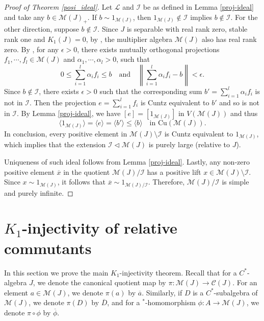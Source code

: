 \documentclass[reqno]{amsart}
\theoremstyle{definition}
\theoremstyle{remark}
\numberwithin{equation}{section}
\theoremstyle{definition}
\newcommand{\calC}{\mathcal{C}}
\newcommand{\calM}{\mathcal{M}}
\newcommand{\calL}{\mathcal{L}}
\newcommand{\calI}{\mathcal{I}}
\begin{document}
\begin{proof}[Proof of Theorem \ref{posi_ideal}] 
Let $\calL$ and $\calI$ be as defined in Lemma \ref{proj-ideal} and take any $b\in\calM(J)_+$.  If $b\sim 1_{\calM(J)}$, then $1_{\calM(J)}\notin \calI$ implies $b\notin \calI$. For the other direction, suppose $b\notin \calI$. Since $J$ is separable with real rank zero, stable rank one and $K_{1}(J) = 0$, by \cite[Theorem 10]{RR-LHX}, the multiplier algebra $\calM(J)$ also has real rank zero. By \cite[Lemma 2.3]{proj-decomp}, for any  $\epsilon >0$, there exists mutually orthogonal projections $f_{1}, \cdots, f_{l}\in\calM(J)$ and $\alpha_{1}, \cdots, \alpha_{l}>0$, such that 
\begin{equation}
0\leq \sum_{i=1}^{l}\alpha_{i}f_{i} \leq b \quad \text{and} \quad \left\|\sum_{i=1}^{l}\alpha_{i}f_{i}-b\right\| < \epsilon. 
\end{equation}
Since $b\notin \calI$, there exists $\epsilon > 0$ such that the corresponding sum $b'=\sum_{i=1}^{l}\alpha_{i}f_{i}$ is not in $\calI$. Then the projection $e = \sum_{i=1}^{l} f_{i}$ is Cuntz equivalent to $b'$ and so is not in $\calI$. By Lemma \ref{proj-ideal}, we have $[e] = [1_{\calM(J)}]$ in $V(\calM(J))$ and thus 
\begin{equation}
\langle 1_{\calM(J)}\rangle = \langle e \rangle = \langle b' \rangle\leq \langle b \rangle \quad \text{in } \mathrm{Cu}(\calM(J)). 
\end{equation} 
In conclusion, every positive element in $\calM(J) \setminus  \calI$ is Cuntz equivalent to $1_{\calM(J)}$, which implies that the extension $\calI\lhd \calM(J)$ is purely large (relative to $J$). 

Uniqueness of such ideal follows from Lemma \ref{proj-ideal}.  Lastly, any non-zero positive element $\overline{x}$ in the quotient $\calM(J) / \calI$ has a positive lift $x\in \calM(J)\setminus \calI$. Since $x\sim 1_{\calM(J)}$, it follows that $\overline{x}\sim 1_{\calM(J) / \calI}$. Therefore, $\calM(J) / \calI$ is simple and purely infinite.
\end{proof} 


\section{$K_{1}$-injectivity of relative commutants}  
\label{K1_Paschke_chapter} 
In this section we prove the main $K_1$-injectivity theorem. Recall that for a $C^*$-algebra $J$, we denote the canonical quotient map by $\pi: \calM(J)\rightarrow \calC(J)$. For an element $a\in \calM(J)$, we denote $\pi(a)$ by $\overline{a}$. Similarly, if $D$ is a $C^*$-subalgebra of $\calM(J)$, we denote $\pi(D)$ by $\overline{D}$, and for a $^*$-homomorphism $\phi\colon A\to \calM(J)$, we denote $\pi \circ \phi$ by $\overline{\phi}$. 
\end{document}
